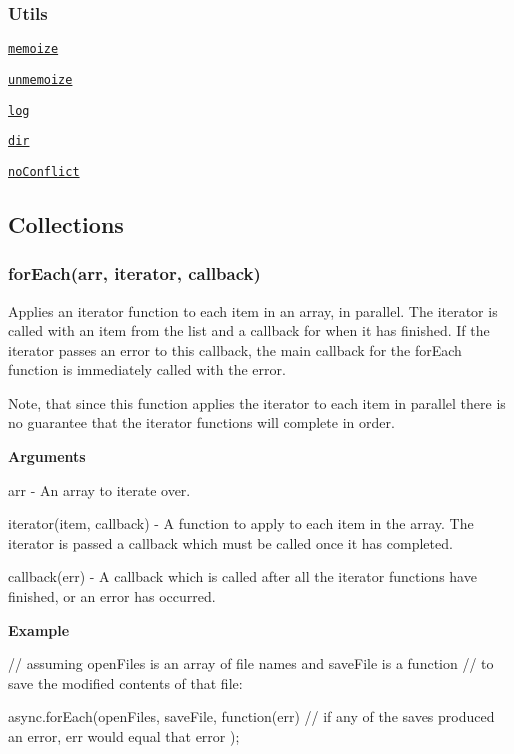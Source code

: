 \subsubsection*{Utils}


\begin{DoxyItemize}
\item \href{#memoize}{\tt memoize}
\item \href{#unmemoize}{\tt unmemoize}
\item \href{#log}{\tt log}
\item \href{#dir}{\tt dir}
\item \href{#noConflict}{\tt no\+Conflict}
\end{DoxyItemize}

\subsection*{Collections}

\label{_forEach}%
 \subsubsection*{for\+Each(arr, iterator, callback)}

Applies an iterator function to each item in an array, in parallel. The iterator is called with an item from the list and a callback for when it has finished. If the iterator passes an error to this callback, the main callback for the for\+Each function is immediately called with the error.

Note, that since this function applies the iterator to each item in parallel there is no guarantee that the iterator functions will complete in order.

{\bfseries Arguments}


\begin{DoxyItemize}
\item arr -\/ An array to iterate over.
\item iterator(item, callback) -\/ A function to apply to each item in the array. The iterator is passed a callback which must be called once it has completed.
\item callback(err) -\/ A callback which is called after all the iterator functions have finished, or an error has occurred.
\end{DoxyItemize}

{\bfseries Example} \begin{DoxyVerb}// assuming openFiles is an array of file names and saveFile is a function
// to save the modified contents of that file:

async.forEach(openFiles, saveFile, function(err){
    // if any of the saves produced an error, err would equal that error
});
\end{DoxyVerb}






